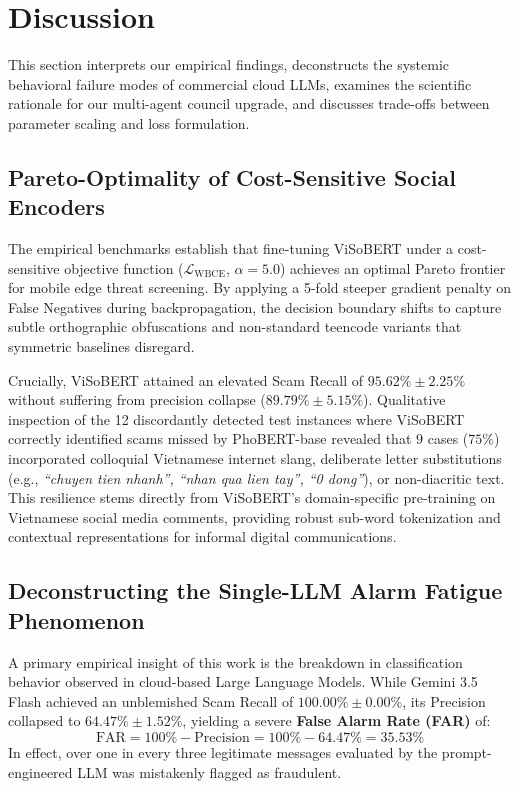 \section{Discussion}
\label{sec:discussion}

This section interprets our empirical findings, deconstructs the systemic behavioral failure modes of commercial cloud LLMs, examines the scientific rationale for our multi-agent council upgrade, and discusses trade-offs between parameter scaling and loss formulation.

\subsection{Pareto-Optimality of Cost-Sensitive Social Encoders}
The empirical benchmarks establish that fine-tuning ViSoBERT under a cost-sensitive objective function ($\mathcal{L}_{\text{WBCE}}$, $\alpha=5.0$) achieves an optimal Pareto frontier for mobile edge threat screening. By applying a 5-fold steeper gradient penalty on False Negatives during backpropagation, the decision boundary shifts to capture subtle orthographic obfuscations and non-standard teencode variants that symmetric baselines disregard.

Crucially, ViSoBERT attained an elevated Scam Recall of $95.62\% \pm 2.25\%$ without suffering from precision collapse ($89.79\% \pm 5.15\%$). Qualitative inspection of the 12 discordantly detected test instances where ViSoBERT correctly identified scams missed by PhoBERT-base revealed that $9$ cases ($75\%$) incorporated colloquial Vietnamese internet slang, deliberate letter substitutions (e.g., \textit{``chuyen tien nhanh'', ``nhan qua lien tay'', ``0 dong''}), or non-diacritic text. This resilience stems directly from ViSoBERT's domain-specific pre-training on Vietnamese social media comments, providing robust sub-word tokenization and contextual representations for informal digital communications.

\subsection{Deconstructing the Single-LLM Alarm Fatigue Phenomenon}
A primary empirical insight of this work is the breakdown in classification behavior observed in cloud-based Large Language Models. While Gemini 3.5 Flash achieved an unblemished Scam Recall of $100.00\% \pm 0.00\%$, its Precision collapsed to $64.47\% \pm 1.52\%$, yielding a severe \textbf{False Alarm Rate (FAR)} of:
\begin{equation}
\label{eq:false_alarm_rate}
\text{FAR} = 100\% - \text{Precision} = 100\% - 64.47\% = 35.53\%
\end{equation}
In effect, over one in every three legitimate messages evaluated by the prompt-engineered LLM was mistakenly flagged as fraudulent.


